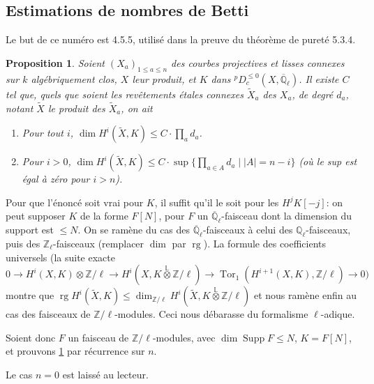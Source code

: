 \documentclass[12pt,a4paper]{article}
\theoremstyle{plain}
\newtheorem{proposition}[theorem]{Proposition}
\theoremstyle{definition}
\DeclareMathOperator{\Supp}{Supp}
\DeclareMathOperator{\Tor}{Tor}
\DeclareMathOperator{\rg}{rg}
\begin{document}
\subsection{Estimations de nombres de Betti}

Le but de ce num\'{e}ro est 4.5.5, utilis\'{e} dans la preuve du th\'{e}or\`{e}me de puret\'{e} 5.3.4.

\begin{proposition}\label{prop:4.5.1}
Soient $(X_{a})_{1 \leq a \leq n}$ des courbes projectives et lisses connexes sur $k$ alg\'{e}briquement clos, $X$ leur produit, et $K$ dans ${}^{p}D_{c}^{\leq 0}(X,\overline{\mathbb{Q}}_{\ell})$. Il existe $C$ tel que, quels que soient les rev\^{e}tements \'{e}tales connexes $\tilde{X}_{a}$ des $X_{a}$, de degr\'{e} $d_{a}$, notant $\tilde{X}$ le produit des $\tilde{X}_{a}$, on ait
\begin{enumerate}
\item[(i)] Pour tout $i$, $\dim H^{i}(\tilde{X}, K) \leq C \cdot \prod_{a} d_{a}$.
\item[(ii)] Pour $i > 0$, $\dim H^{i}(\tilde{X}, K) \leq C \cdot \sup\{\prod_{a \in A} d_{a} \mid |A| = n-i\}$ (o\`{u} le sup est \'{e}gal \`{a} z\'{e}ro pour $i > n$).
\end{enumerate}
\end{proposition}

Pour que l'\'{e}nonc\'{e} soit vrai pour $K$, il suffit qu'il le soit pour les $H^{j}K[-j]$: on peut supposer $K$ de la forme $F[N]$, pour $F$ un $\overline{\mathbb{Q}}_{\ell}$-faisceau dont la dimension du support est $\leq N$. On se ram\`{e}ne du cas des $\overline{\mathbb{Q}}_{\ell}$-faisceaux \`{a} celui des $\mathbb{Q}_{\ell}$-faisceaux, puis des $\mathbb{Z}_{\ell}$-faisceaux (remplacer $\dim$ par $\rg$). La formule des coefficients universels (la suite exacte
\[
0 \longrightarrow H^{i}(X,K) \otimes \mathbb{Z}/\ell \longrightarrow H^{i}(X, K \overset{\mathbb{L}}{\otimes} \mathbb{Z}/\ell) \longrightarrow \Tor_{1}(H^{i+1}(X,K), \mathbb{Z}/\ell) \longrightarrow 0)
\]
montre que $\rg H^{i}(\tilde{X},K) \leq \dim_{\mathbb{Z}/\ell} H^{i}(\tilde{X}, K \overset{\mathbb{L}}{\otimes} \mathbb{Z}/\ell)$ et nous ram\`{e}ne enfin au cas des faisceaux de $\mathbb{Z}/\ell$-modules. Ceci nous d\'{e}barasse du formalisme $\ell$-adique.

Soient donc $F$ un faisceau de $\mathbb{Z}/\ell$-modules, avec $\dim \Supp F \leq N$, $K = F[N]$, et prouvons \ref{prop:4.5.1} par r\'{e}currence sur $n$.

Le cas $n = 0$ est laiss\'{e} au lecteur.
\end{document}
